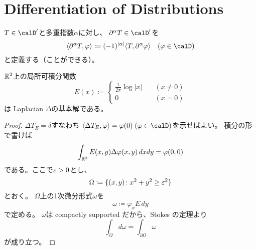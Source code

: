 \documentclass[report]{jlreq}
\begin{document}
%
\section{Differentiation of Distributions}

\begin{definition}[超関数の微分]
    $T \in \calD'$と多重指数$\alpha$に対し、
    $\partial^\alpha T \in \calD'$を
    \begin{equation}
        \langle \partial^\alpha T, \varphi \rangle
            \coloneqq (-1)^{|\alpha|} \langle T, \partial^\alpha \varphi \rangle
            \quad (\varphi \in \calD)
    \end{equation}
    と定義する（ことができる）。
\end{definition}

\begin{example}[Heaviside 関数]
    \TODO{}
\end{example}

\begin{theorem}
    $\mathbb{R}^2$上の局所可積分関数
    \begin{equation}
        E(x) \coloneqq \begin{cases}
            \frac{1}{2\pi} \log |x| &\quad (x \neq 0) \\
            0 &\quad (x = 0)
        \end{cases}
    \end{equation}
    は Laplacian $\Delta$の基本解である。
\end{theorem}

\begin{proof}
    $\Delta T_E = \delta$すなわち
    $\langle \Delta T_E, \varphi \rangle = \varphi(0)\; (\varphi \in \calD)$を示せばよい。
    積分の形で書けば
    \begin{equation}
        \int_{\mathbb{R}^2} E(x, y) \Delta\varphi(x, y)\, dx dy = \varphi(0, 0)
    \end{equation}
    である。ここで$\varepsilon > 0$とし、
    \begin{equation}
        \Omega \coloneqq \{ (x, y) \colon x^2 + y^2 \ge \varepsilon^2 \}
    \end{equation}
    とおく。
    $\Omega$上の1次微分形式$\omega$を
    \begin{equation}
        \omega \coloneqq \varphi_x E\, dy
    \end{equation}
    で定める。
    $\omega$は compactly supported だから、Stokes の定理より
    \begin{equation}
        \int_\Omega d\omega = \int_{\partial\Omega} \omega
    \end{equation}
    が成り立つ。
    \TODO{}
\end{proof}
\end{document}
